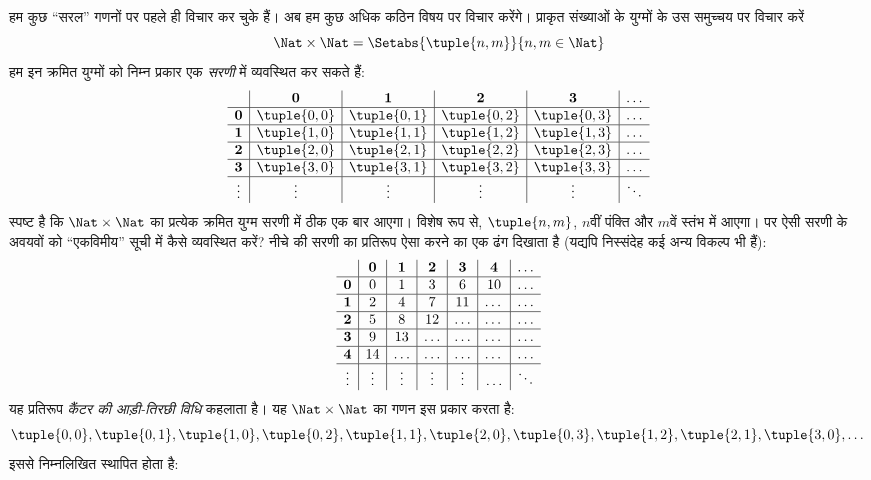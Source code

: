 \documentclass[../../../include/open-logic-section]{subfiles}
\begin{document}


\begin{explain}
हम कुछ ``सरल'' गणनों पर पहले ही विचार कर चुके हैं। अब हम कुछ अधिक कठिन विषय
पर विचार करेंगे। प्राकृत संख्याओं के युग्मों के उस समुच्चय पर विचार करें
\[
\Nat \times \Nat = \Setabs{\tuple{n,m}}{n,m \in \Nat}
\]
हम इन क्रमित युग्मों को निम्न प्रकार एक \emph{सरणी} में व्यवस्थित कर सकते हैं:
\[
\begin{array}{ c | c | c | c | c | c}
& \mathbf 0 & \mathbf 1 & \mathbf 2 & \mathbf 3 & \dots \\
\hline
\mathbf 0 & \tuple{0,0} & \tuple{0,1} & \tuple{0,2} & \tuple{0,3} & \dots \\
\hline
\mathbf 1 & \tuple{1,0} & \tuple{1,1} & \tuple{1,2} & \tuple{1,3} & \dots \\
\hline
\mathbf 2 & \tuple{2,0} & \tuple{2,1} & \tuple{2,2} & \tuple{2,3} & \dots \\
\hline
\mathbf 3 & \tuple{3,0} & \tuple{3,1} & \tuple{3,2} & \tuple{3,3} & \dots \\
\hline
\vdots & \vdots & \vdots & \vdots & \vdots & \ddots\\
\end{array}
\]
स्पष्ट है कि $\Nat \times \Nat$ का प्रत्येक क्रमित युग्म सरणी में ठीक एक बार
आएगा। विशेष रूप से, $\tuple{n,m}$, $n$वीं पंक्ति और $m$वें स्तंभ में आएगा।
पर ऐसी सरणी के अवयवों को ``एकविमीय'' सूची में कैसे व्यवस्थित करें? नीचे की
सरणी का प्रतिरूप ऐसा करने का एक ढंग दिखाता है (यद्यपि निस्संदेह कई अन्य विकल्प
भी हैं):
\[
\begin{array}{ c | c | c | c | c | c | c}
& \mathbf 0 & \mathbf 1 & \mathbf 2 & \mathbf 3 & \mathbf 4 &\dots \\
\hline
\mathbf 0 & 0  & 1& 3 & 6& 10 &\ldots \\
\hline
\mathbf 1 &2 & 4& 7 & 11 & \dots &\ldots \\
\hline
\mathbf 2 & 5 & 8 & 12 & \ldots & \dots&\ldots \\
\hline
\mathbf 3 & 9 & 13 & \ldots & \ldots & \dots & \ldots \\
\hline
\mathbf 4 & 14 & \ldots & \ldots & \ldots & \dots & \ldots \\
\hline
\vdots & \vdots & \vdots & \vdots & \vdots&\ldots & \ddots\\
\end{array}
\]\noindent
यह प्रतिरूप \emph{कैंटर की आड़ी-तिरछी विधि} कहलाता है। यह
$\Nat \times \Nat$ का गणन इस प्रकार करता है:
\[
\tuple{0,0}, \tuple{0,1}, \tuple{1,0}, \tuple{0,2}, \tuple{1,1},
\tuple{2,0}, \tuple{0,3}, \tuple{1,2}, \tuple{2,1}, \tuple{3,0}, \dots
\]
इससे निम्नलिखित स्थापित होता है:
\end{explain}
\end{document}
